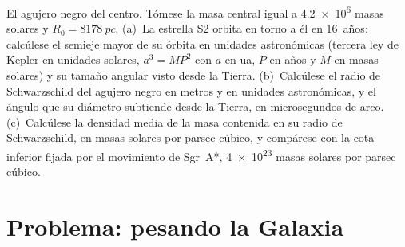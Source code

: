 \begin{exercise}[$\star\star\star$]\label{exo:b3:milky-way-galaxies:12}
El agujero negro del centro. Tómese la masa central igual a
\num{4.2e6} masas solares y $R_0 = \qty{8178}{pc}$. (a)~La estrella S2
orbita en torno a él en \num{16}~años: calcúlese el semieje mayor de su órbita en
unidades astronómicas (tercera ley de Kepler en unidades solares, $a^3 = MP^2$ con
$a$ en ua, $P$ en años y $M$ en masas solares) y su tamaño angular visto
desde la Tierra. (b)~Calcúlese el radio de Schwarzschild del agujero negro en
metros y en unidades astronómicas, y el ángulo que su diámetro
subtiende desde la Tierra, en microsegundos de arco. (c)~Calcúlese la densidad media
de la masa contenida en su radio de Schwarzschild, en masas solares por
parsec cúbico, y compárese con la cota inferior fijada por el movimiento de Sgr~A*,
\num{4e23} masas solares por parsec cúbico.
\end{exercise}

\section{Problema: pesando la Galaxia}

